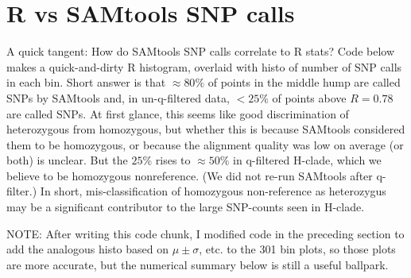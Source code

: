 \documentclass{article}\usepackage[]{graphicx}\usepackage[]{color}
\begin{document}
\section{R vs SAMtools SNP calls}
\label{sec:rvsam}

A quick tangent: How do SAMtools SNP calls correlate to R stats?  Code below makes a quick-and-dirty R histogram, overlaid with histo of number of SNP calls in each bin.  Short answer is that $\approx80\%$ of points in the middle hump are called SNPs by SAMtools and, in un-q-filtered data, $<25\%$ of points above $R=0.78$ are called SNPs.  At first glance, this seems like good discrimination of heterozygous from homozygous, but whether this is because SAMtools considered them to be homozygous, or because the alignment quality was low on average (or both) is unclear.  But the $25\%$ rises to $\approx50\%$ in q-filtered H-clade, which we believe to be homozygous nonreference.  (We did not re-run SAMtools after q-filter.)  In short, mis-classification of homozygous non-reference as heterozygus may be a significant contributor to the large SNP-counts seen in H-clade.  

NOTE: After writing this code chunk, I modified code in the preceding section to add the analogous histo based on $\mu\pm\sigma$, etc. to the 301 bin plots, so those plots are more accurate, but the numerical summary below is still a useful ballpark.
\end{document}
